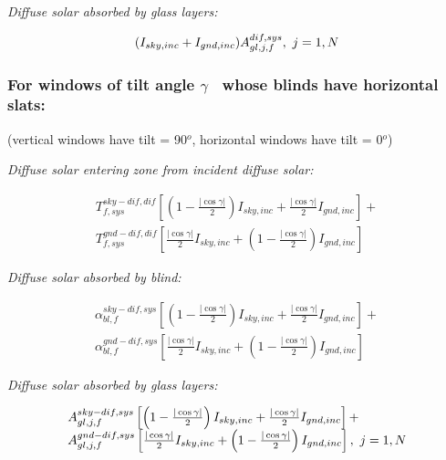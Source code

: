 \emph{Diffuse solar absorbed by glass layers:}

\begin{equation}
({I_{sky,inc}} + {I_{gnd,inc}})A_{gl,j,f}^{dif,sys},{\rm{   }}~j = 1,N{\rm{ }}
\end{equation}

\subsubsection{For windows of tilt angle \(\gamma\) ~whose blinds have horizontal slats:}\label{for-windows-of-tilt-angle-gamma-whose-blinds-have-horizontal-slats}

(vertical windows have tilt = 90\(^{o}\), horizontal windows have tilt = 0\(^{o}\))

\emph{Diffuse solar entering zone from incident diffuse solar:}

\begin{equation}
\begin{split}
T_{f,sys}^{sky - dif,dif}\left[ {\left( {1 - \frac{{|\cos \gamma |}}{2}} \right){I_{sky,inc}} + \frac{{|\cos \gamma |}}{2}{I_{gnd,inc}}} \right] + \\
T_{f,sys}^{gnd - dif,dif}\left[ {\frac{{|\cos \gamma |}}{2}{I_{sky,inc}} + \left( {1 - \frac{{|\cos \gamma |}}{2}} \right){I_{gnd,inc}}} \right]
\end{split}
\end{equation}

\emph{Diffuse solar absorbed by blind:}

\begin{equation}
\begin{split}
\alpha_{bl,f}^{sky - dif,sys}\left[ {\left( {1 - \frac{{|\cos \gamma |}}{2}} \right){I_{sky,inc}} + \frac{{|\cos \gamma |}}{2}{I_{gnd,inc}}} \right] + \\
\alpha_{bl,f}^{gnd - dif,sys}\left[ {\frac{{|\cos \gamma |}}{2}{I_{sky,inc}} + \left( {1 - \frac{{|\cos \gamma |}}{2}} \right){I_{gnd,inc}}} \right]
\end{split}
\end{equation}

\emph{Diffuse solar absorbed by glass layers:}

\begin{equation}
\begin{array}{l}A_{gl,j,f}^{sky - dif,sys}\left[ {\left( {1 - \frac{{|\cos \gamma |}}{2}} \right){I_{sky,inc}} + \frac{{|\cos \gamma |}}{2}{I_{gnd,inc}}} \right] + \\A_{gl,j,f}^{gnd - dif,sys}\left[ {\frac{{|\cos \gamma |}}{2}{I_{sky,inc}} + \left( {1 - \frac{{|\cos \gamma |}}{2}} \right){I_{gnd,inc}}} \right],{\rm{    }}~j = 1,N\end{array}
\end{equation}

